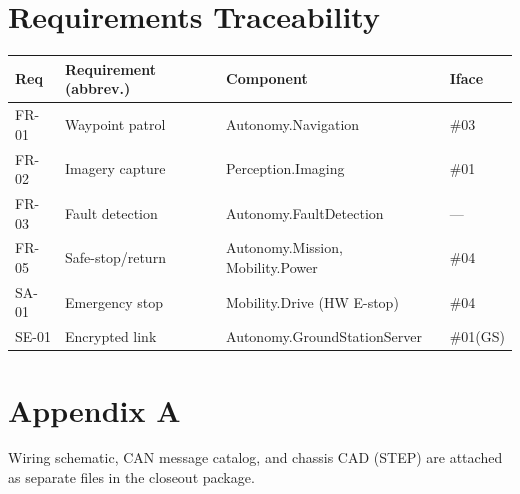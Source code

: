 \documentclass[11pt,letterpaper]{article}
\begin{document}
\section{Requirements Traceability}
\begin{table}[H]\begin{center}\begin{tabular}{ | p{1.6cm} | p{5cm} | p{3.4cm} | p{1.6cm} |}\hline
\textbf{Req} & \textbf{Requirement (abbrev.)} & \textbf{Component} & \textbf{Iface} \\ \hline
FR-01 & Waypoint patrol & Autonomy.Navigation & \#03 \\ \hline
FR-02 & Imagery capture & Perception.Imaging & \#01 \\ \hline
FR-03 & Fault detection & Autonomy.FaultDetection & --- \\ \hline
FR-05 & Safe-stop/return & Autonomy.Mission, Mobility.Power & \#04 \\ \hline
SA-01 & Emergency stop & Mobility.Drive (HW E-stop) & \#04 \\ \hline
SE-01 & Encrypted link & Autonomy.GroundStationServer & \#01(GS) \\ \hline
\end{tabular}\end{center}\end{table}

\section{Appendix A}
Wiring schematic, CAN message catalog, and chassis CAD (STEP) are attached as
separate files in the closeout package.


{}
\end{document}
